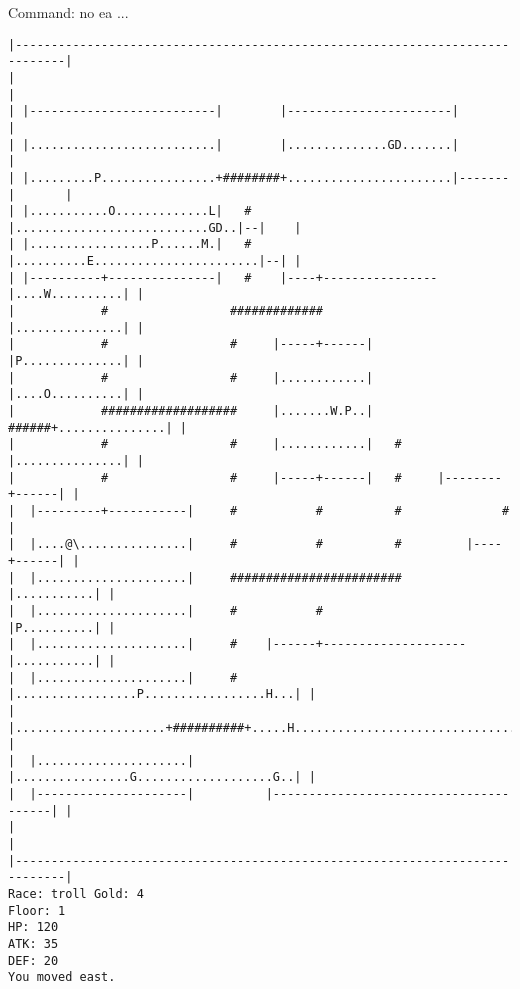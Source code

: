 \documentclass[11pt]{article}
\theoremstyle{plain}
\begin{document}
Command: no ea ...

\begin{Verbatim}[fontsize=\small]
|-----------------------------------------------------------------------------|
|                                                                             |
| |--------------------------|        |-----------------------|               |
| |..........................|        |..............GD.......|               |
| |.........P................+########+.......................|-------|       |
| |...........O.............L|   #    |...........................GD..|--|    |
| |.................P......M.|   #    |..........E.......................|--| |
| |----------+---------------|   #    |----+----------------|....W..........| |
|            #                 #############                |...............| |
|            #                 #     |-----+------|         |P..............| |
|            #                 #     |............|         |....O..........| |
|            ###################     |.......W.P..|   ######+...............| |
|            #                 #     |............|   #     |...............| |
|            #                 #     |-----+------|   #     |--------+------| |
|  |---------+-----------|     #           #          #              #        |
|  |....@\...............|     #           #          #         |----+------| |
|  |.....................|     ########################         |...........| |
|  |.....................|     #           #                    |P..........| |
|  |.....................|     #    |------+--------------------|...........| |
|  |.....................|     #    |.................P.................H...| |
|  |.....................+##########+.....H.................................| |
|  |.....................|          |................G...................G..| |
|  |---------------------|          |---------------------------------------| |
|                                                                             |
|-----------------------------------------------------------------------------|
Race: troll Gold: 4                                                    Floor: 1
HP: 120
ATK: 35
DEF: 20
You moved east. 
\end{Verbatim}
\end{document}
